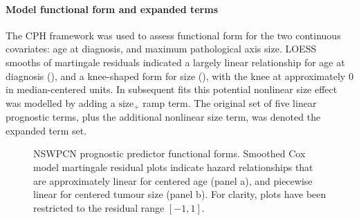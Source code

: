 \documentclass[dissertation.tex]{subfiles}
\begin{document}
\paragraph{Model functional form and expanded terms}
The \gls{CPH} framework was used to assess functional form for the two continuous covariates: age at diagnosis, and maximum pathological axis size.  \Gls{LOESS} smooths of martingale residuals \cite{Therneau1990} indicated a largely linear relationship for age at diagnosis (), and a knee-shaped form for size (), with the knee at approximately $0$ in median-centered units.  In subsequent fits this potential nonlinear size effect was modelled by adding a $\mbox{size}_+$ ramp term.  The original set of five linear prognostic terms, plus the additional nonlinear size term, was denoted the expanded term set.

\begin{figure}
\centering
\caption[Prognostic predictor functional forms]{\gls{NSWPCN} prognostic predictor functional forms. Smoothed Cox model martingale residual plots indicate hazard relationships that are approximately linear for centered age (panel a), and piecewise linear for centered tumour size (panel b).  For clarity, plots have been restricted to the residual range $[-1,1]$.}
\label{fig:nomo-funcform}
\end{figure}
\end{document}
